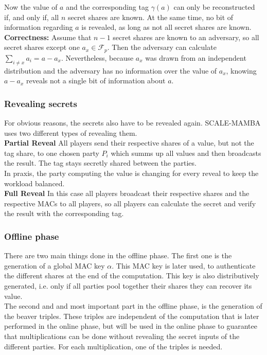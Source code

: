 \documentclass[english,runningheads,a4paper]{llncs}[2018/03/10]
\begin{document}
Now the value of \(a\) and the corresponding tag \(\gamma(a)\) can only be reconstructed if, and only if, all \(n\) secret shares are known. At the same time, no bit of information regarding \(a\) is revealed, as long as not all secret shares are known.\\
\textbf{Correctness:} Assume that $n-1$ secret shares are known to an adversary, so all secret shares except one $a_x \in \mathcal{F}_p $. Then the adversary can calculate $\sum_{i \neq x} a_i = a-a_x$. Nevertheless, because $a_x$ was drawn from an independent distribution and the adversary has no information over the value of \(a_x\), knowing $a-a_x$ reveals not a single bit of information about $a$.\\


\subsubsection{Revealing secrets}

For obvious reasons, the secrets also have to be revealed again. SCALE-MAMBA uses two different types of revealing them.\\

\textbf{Partial Reveal}
All players send their respective shares of a value, but not the tag share, to one chosen party \(P_i\) which summs up all values and then broadcasts the result. The tag stays secretly shared between the parties.\\
In praxis, the party computing the value is changing for every reveal to keep the workload balanced.\\
\textbf{Full Reveal}
In this case all players broadcast their respective shares and the respective MACs to all players, so all players can calculate the secret and verify the result with the corresponding tag.\\


\subsubsection{Offline phase}

There are two main things done in the offline phase. The first one is the generation of a global MAC key $\alpha$. This MAC key is later used, to authenticate the different shares at the end of the computation. This key is also distributively generated, i.e. only if all parties pool together their shares they can recover its value.\\


The second and and most important part in the offline phase, is the generation of the beaver triples. These triples  are independent of the computation that is later performed in the online phase, but will be used in the online phase to guarantee that multiplications can be done without revealing the secret inputs of the different parties. For each multiplication, one of the triples is needed.
\end{document}

